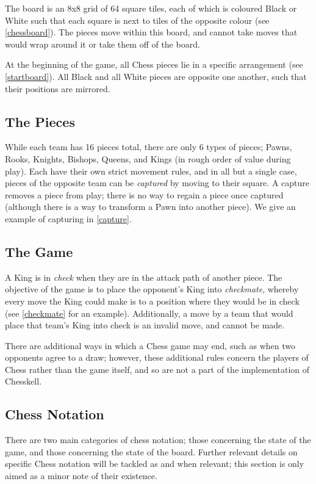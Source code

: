 \documentclass[12pt, a4paper, bibliography=totocnumbered]{scrreprt}
\begin{document}
The board is an 8x8 grid of 64 square tiles, each of which is coloured Black or White such that each square is next to tiles of the opposite colour (see \cref{chessboard}). The pieces move within this board, and cannot take moves that would wrap around it or take them off of the board.

At the beginning of the game, all Chess pieces lie in a specific arrangement (see \cref{startboard}). All Black and all White pieces are opposite one another, such that their positions are mirrored.

\subsection{The Pieces}

While each team has 16 pieces total, there are only 6 types of pieces; Pawns, Rooks, Knights, Bishops, Queens, and Kings (in rough order of value during play). Each have their own strict movement rules, and in all but a single case, pieces of the opposite team can be \emph{captured} by moving to their square. A capture removes a piece from play; there is no way to regain a piece once captured (although there is a way to transform a Pawn into another piece). We give an example of capturing in \cref{capture}.

\subsection{The Game}

A King is in \emph{check} when they are in the attack path of another piece. The objective of the game is to place the opponent's King into \emph{checkmate}, whereby every move the King could make is to a position where they would be in check (see \cref{checkmate} for an example). Additionally, a move by a team that would place that team's King into check is an invalid move, and cannot be made.

There are additional ways in which a Chess game may end, such as when two opponents agree to a draw; however, these additional rules concern the players of Chess rather than the game itself, and so are not a part of the implementation of Chesskell.

\subsection{Chess Notation}

There are two main categories of chess notation; those concerning the state of the game, and those concerning the state of the board. Further relevant details on specific Chess notation will be tackled as and when relevant; this section is only aimed as a minor note of their existence.
\end{document}
